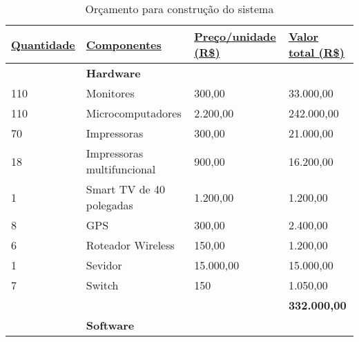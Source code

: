 \begin{table}[H]
       \centering
       \caption{Orçamento para construção do sistema}
       \begin{tabular}{|l|l|l|l|}
       \hline
       {\ul \textbf{Quantidade}} & {\ul \textbf{Componentes}}         & {\ul \textbf{Preço/unidade (R\$)}} & {\ul \textbf{Valor total (R\$)}} \\ \hline
                                 & \textbf{Hardware}                  &                                    &                                  \\ \hline
       110                       & Monitores                          & 300,00                             & 33.000,00                        \\ \hline
       110                       & Microcomputadores                  & 2.200,00                           & 242.000,00                       \\ \hline
       70                        & Impressoras                        & 300,00                             & 21.000,00                        \\ \hline
       18                        & Impressoras multifuncional         & 900,00                             & 16.200,00                        \\ \hline
       1                         & Smart TV de 40 polegadas           & 1.200,00                           & 1.200,00                         \\ \hline
       8                         & GPS                                & 300,00                             & 2.400,00                         \\ \hline
       6                         & Roteador Wireless                  & 150,00                             & 1.200,00                         \\ \hline
       1                         & Sevidor                            & 15.000,00                          & 15.000,00                        \\ \hline
       7                         & Switch                             & 150                                & 1.050,00                         \\ \hline
                                 & \textbf{}                          &                                    & \textbf{332.000,00}              \\ \hline
                                 & \textbf{Software}                  &                                    &                                  \\ \hline

\end{tabular}
\end{table}
